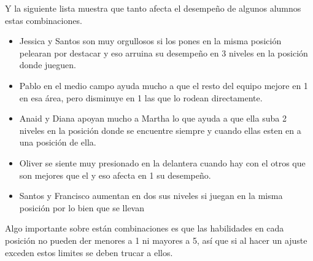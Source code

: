 \documentclass[10pt,letterpaper,twoside,openright]{article}
\begin{document}
	Y la siguiente lista muestra que tanto afecta el desempeño de algunos alumnos estas combinaciones.
	
	\begin{itemize}
		\item Jessica y Santos son muy orgullosos si los pones en la misma posición pelearan por destacar y eso arruina su desempeño en 3 niveles en la posición donde jueguen.
		\item Pablo en el medio campo ayuda mucho a que el resto del equipo mejore en 1 en esa área, pero disminuye en 1 las que lo rodean directamente.
		\item Anaid y Diana apoyan mucho a Martha lo que ayuda a que ella suba 2 niveles en la posición donde se encuentre siempre y cuando ellas esten en a una posición de ella.
		\item Oliver se siente muy presionado en la delantera cuando hay con el otros que son mejores que el y eso afecta en 1 su desempeño.
		\item Santos y Francisco aumentan en dos sus niveles si juegan en la misma posición por lo bien que se llevan 
	\end{itemize}
	
	Algo importante sobre están combinaciones es que las habilidades en cada posición no pueden der menores a 1 ni mayores a 5, así que si al hacer un ajuste exceden estos limites se deben trucar a ellos.
	
\end{document}
